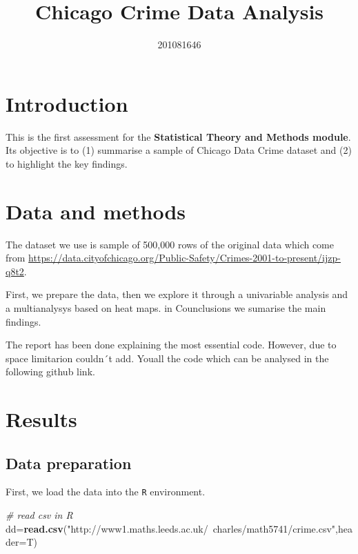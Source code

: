 \documentclass[]{article}
\title{Chicago Crime Data Analysis}
\author{201081646}
\date{}
\newenvironment{Shaded}{\begin{snugshade}}{\end{snugshade}}
\newcommand{\KeywordTok}[1]{\textcolor[rgb]{0.13,0.29,0.53}{\textbf{{#1}}}}
\newcommand{\DataTypeTok}[1]{\textcolor[rgb]{0.13,0.29,0.53}{{#1}}}
\newcommand{\StringTok}[1]{\textcolor[rgb]{0.31,0.60,0.02}{{#1}}}
\newcommand{\CommentTok}[1]{\textcolor[rgb]{0.56,0.35,0.01}{\textit{{#1}}}}
\newcommand{\NormalTok}[1]{{#1}}
\begin{document}
\maketitle

\section{Introduction}\label{introduction}

This is the first assessment for the \textbf{Statistical Theory and
Methods module}. Its objective is to (1) summarise a sample of Chicago
Data Crime dataset and (2) to highlight the key findings.

\section{Data and methods}\label{data-and-methods}

The dataset we use is sample of 500,000 rows of the original data which
come from
\url{https://data.cityofchicago.org/Public-Safety/Crimes-2001-to-present/ijzp-q8t2}.

First, we prepare the data, then we explore it through a univariable
analysis and a multianalysys based on heat maps. in Counclusions we
sumarise the main findings.

The report has been done explaining the most essential code. However,
due to space limitarion couldn´t add. Youall the code which can be
analysed in the following github link.

\section{Results}\label{results}

\subsection{Data preparation}\label{data-preparation}

First, we load the data into the \texttt{R} environment.

\begin{Shaded}
\begin{Highlighting}[]
\CommentTok{# read csv in R}
\NormalTok{dd=}\KeywordTok{read.csv}\NormalTok{(}\StringTok{"http://www1.maths.leeds.ac.uk/~charles/math5741/crime.csv"}\NormalTok{,}\DataTypeTok{header=}\NormalTok{T)}
\end{Highlighting}
\end{Shaded}
\end{document}
